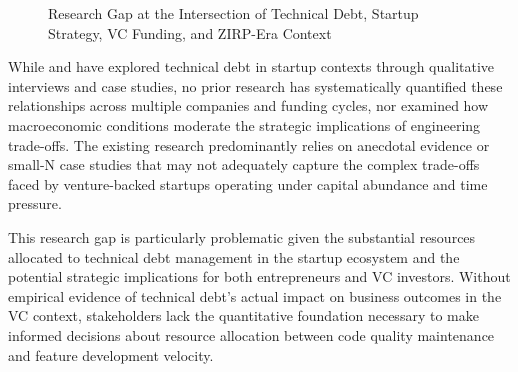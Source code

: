 \begin{figure}[htbp]
\caption{Research Gap at the Intersection of Technical Debt, Startup Strategy, VC Funding, and ZIRP-Era Context}
\label{fig:research_gap}
\end{figure}

While \citet{besker2018embracing} and \citet{cico2021toward} have explored technical debt in startup contexts through qualitative interviews and case studies, no prior research has systematically quantified these relationships across multiple companies and funding cycles, nor examined how macroeconomic conditions moderate the strategic implications of engineering trade-offs. The existing research predominantly relies on anecdotal evidence or small-N case studies that may not adequately capture the complex trade-offs faced by venture-backed startups operating under capital abundance and time pressure.

This research gap is particularly problematic given the substantial resources allocated to technical debt management in the startup ecosystem and the potential strategic implications for both entrepreneurs and \ac{VC} investors. Without empirical evidence of technical debt's actual impact on business outcomes in the \ac{VC} context, stakeholders lack the quantitative foundation necessary to make informed decisions about resource allocation between code quality maintenance and feature development velocity.

